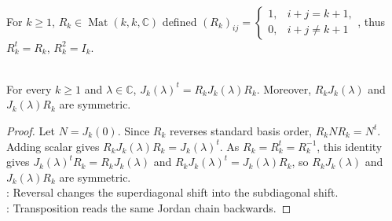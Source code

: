 \begin{definition} \label{def:reversal-matrix} \\
For $k\geq1$,  $R_k\in\operatorname{Mat}(k,k,\mathbb{C})$ defined $(R_k)_{ij}=
\begin{cases}
1,& i+j=k+1,\\
0,& i+j\neq k+1
\end{cases}$, thus $R_k^t=R_k$, $R_k^2=I_k$.
\end{definition}

\begin{lemma} \label{lem:jordan-block-transpose-reversal-similarity} \\
For every $k\geq1$ and $\lambda\in\mathbb{C}$, $J_k(\lambda)^t=R_kJ_k(\lambda)R_k$. Moreover, $R_kJ_k(\lambda)$ and $J_k(\lambda)R_k$ are symmetric.
\begin{proof}
Let $N=J_k(0)$. Since $R_k$ reverses standard basis order, $R_kNR_k=N^t$.\\
Adding scalar gives $R_kJ_k(\lambda)R_k=J_k(\lambda)^t$. As $R_k=R_k^t=R_k^{-1}$, this identity gives $J_k(\lambda)^tR_k=R_kJ_k(\lambda)$ and $R_kJ_k(\lambda)^t=J_k(\lambda)R_k$, so $R_kJ_k(\lambda)$ and $J_k(\lambda)R_k$ are symmetric.\\
: Reversal changes the superdiagonal shift into the subdiagonal shift.\\
: Transposition reads the same Jordan chain backwards.
\end{proof}
\end{lemma}

